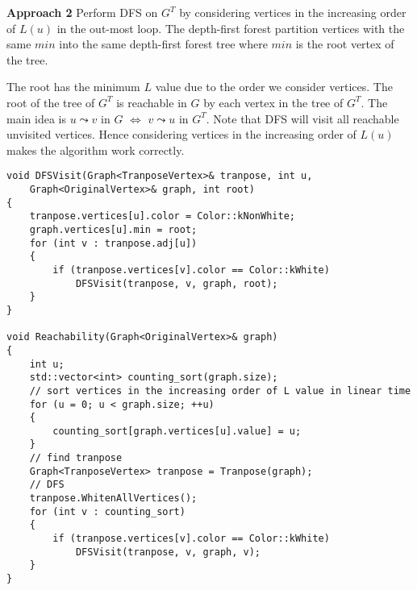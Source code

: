 \textbf{Approach 2}
Perform DFS on $G^T$ by considering vertices 
in the increasing order of $L(u)$ in the out-most loop.
The depth-first forest partition vertices with the same $min$
into the same depth-first forest tree where $min$ is the root
vertex of the tree.

The root has the minimum $L$ value due to the order we consider vertices.
The root of the tree of $G^T$ is reachable in $G$ by each vertex 
in the tree of $G^T$. 
The main idea is $u \leadsto v$ in $G$
$\Longleftrightarrow$
$v \leadsto u$ in $G^T$.
Note that DFS will visit all reachable unvisited vertices.
Hence considering vertices in the increasing order of $L(u)$
makes the algorithm work correctly.

\begin{verbatim}
void DFSVisit(Graph<TranposeVertex>& tranpose, int u, 
    Graph<OriginalVertex>& graph, int root)
{
    tranpose.vertices[u].color = Color::kNonWhite;
    graph.vertices[u].min = root;
    for (int v : tranpose.adj[u])
    {
        if (tranpose.vertices[v].color == Color::kWhite)
            DFSVisit(tranpose, v, graph, root);
    }
}

void Reachability(Graph<OriginalVertex>& graph)
{
    int u;
    std::vector<int> counting_sort(graph.size);
    // sort vertices in the increasing order of L value in linear time
    for (u = 0; u < graph.size; ++u)
    {
        counting_sort[graph.vertices[u].value] = u;
    }
    // find tranpose
    Graph<TranposeVertex> tranpose = Tranpose(graph);
    // DFS
    tranpose.WhitenAllVertices();
    for (int v : counting_sort)
    {
        if (tranpose.vertices[v].color == Color::kWhite)
            DFSVisit(tranpose, v, graph, v);
    }
}
\end{verbatim}

